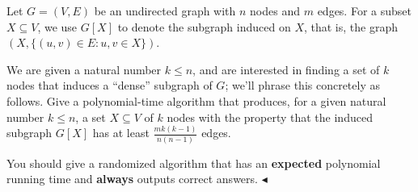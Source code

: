 \documentclass[11pt]{article}
\newenvironment{problem}[2][Problem]{\begin{trivlist}
    \item[\hskip \labelsep{\bfseries#1}\hskip\labelsep{\bfseries#2.}]\mbox{}\newline}{\hfill$\blacktriangleleft$\end{trivlist}}
\begin{document}
\begin{problem}{4. (Dense Induced Graph)}
Let $G=(V, E)$ be an undirected graph with $n$ nodes and $m$ edges. For a subset $X \subseteq V$, we use $G[X]$ to denote the subgraph induced on $X$, that is, the graph $(X,\{(u, v) \in E: u, v \in X\})$.

We are given a natural number $k \leq n$, and are interested in finding a set of $k$ nodes that induces a ``dense'' subgraph of $G$; we'll phrase this concretely as follows. Give a polynomial-time algorithm that produces, for a given natural number $k \leq n$, a set $X \subseteq V$ of $k$ nodes with the property that the induced subgraph $G[X]$ has at least $\frac{m k(k-1)}{n(n-1)}$ edges.

You should give a randomized algorithm that has an \textbf{expected} polynomial running time and \textbf{always} outputs correct answers.
\end{problem}
\end{document}
